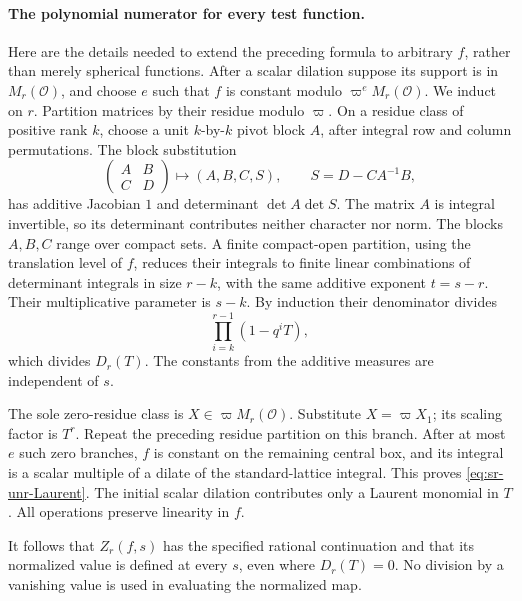 \paragraph{The polynomial numerator for every test function.}
Here are the details needed to extend the preceding formula
to arbitrary \(f\), rather than merely spherical functions.
After a scalar dilation suppose its support is in
\(M_r(\mathcal O)\), and choose \(e\) such that \(f\) is
constant modulo \(\varpi^eM_r(\mathcal O)\).
We induct on \(r\).
Partition matrices by their residue modulo \(\varpi\).
On a residue class of positive rank \(k\), choose a unit
\(k\)-by-\(k\) pivot block \(A\), after integral row and column
permutations.  The block substitution
\[
 \begin{pmatrix}A&B\\ C&D\end{pmatrix}
       \longmapsto (A,B,C,S),\qquad S=D-CA^{-1}B,
\]
has additive Jacobian \(1\) and determinant
\(\det A\det S\).  The matrix \(A\) is integral invertible,
so its determinant contributes neither character nor norm.
The blocks \(A,B,C\) range over compact sets.
A finite compact-open partition, using the translation level
of \(f\), reduces their integrals to finite linear combinations
of determinant integrals in size \(r-k\), with the same
additive exponent \(t=s-r\).
Their multiplicative parameter is \(s-k\).
By induction their denominator divides
\[
          \prod_{i=k}^{r-1}(1-q^iT),
\]
which divides \(D_r(T)\).
The constants from the additive measures are independent of
\(s\).

The sole zero-residue class is \(X\in\varpi M_r(\mathcal O)\).
Substitute \(X=\varpi X_1\); its scaling factor is \(T^r\).
Repeat the preceding residue partition on this branch.
After at most \(e\) such zero branches, \(f\) is constant
on the remaining central box, and its integral is a scalar
multiple of a dilate of the standard-lattice integral.
This proves \eqref{eq:sr-unr-Laurent}.  The initial scalar
dilation contributes only a Laurent monomial in \(T\).
All operations preserve linearity in \(f\).

It follows that \(Z_r(f,s)\) has the specified rational
continuation and that its normalized value is defined at
every \(s\), even where \(D_r(T)=0\).  No division by a
vanishing value is used in evaluating the normalized map.

